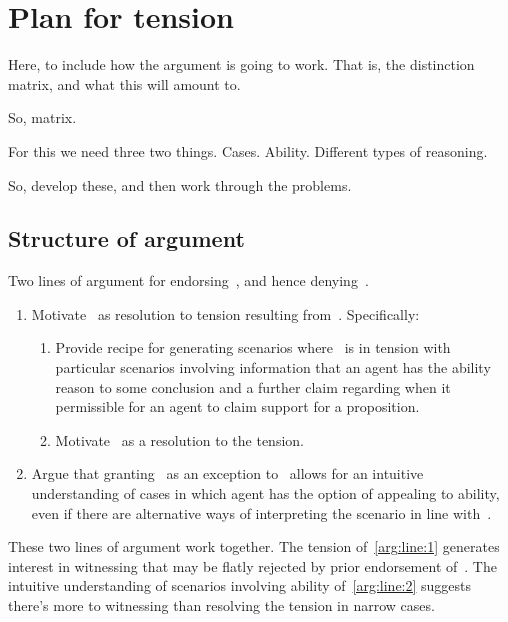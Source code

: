 \chapter{Plan for tension}

\begin{note}
  Here, to include how the argument is going to work.
  That is, the distinction matrix, and what this will amount to.

  So, matrix.

  For this we need three two things.
  Cases.
  Ability.
  Different types of reasoning.

  So, develop these, and then work through the problems.
\end{note}

\section{Structure of argument}
\label{sec:structure-argument}

\begin{note}
  Two lines of argument for endorsing~\EAS{}, and hence denying~\ESU{}.
  \begin{enumerate}[label=(L\arabic*), ref=(L\arabic*)]
  \item\label{arg:line:1} Motivate~\EAS{} as resolution to tension resulting from~\ESU{}.\newline
    Specifically:
    \begin{enumerate}[label=(L1\alph*)]
    \item\label{arg:line:1:a} Provide recipe for generating scenarios where~\ESU{} is in tension with particular scenarios involving information that an agent has the ability reason to some conclusion and a further claim regarding when it permissible for an agent to claim support for a proposition.
    \item\label{arg:line:1:b} Motivate~\EAS{} as a resolution to the tension.
    \end{enumerate}
  \item\label{arg:line:2} Argue that granting~\EAS{} as an exception to~\ESU{} allows for an intuitive understanding of cases in which agent has the option of appealing to ability, even if there are alternative ways of interpreting the scenario in line with~\ESU{}.
  \end{enumerate}
  These two lines of argument work together.
  The tension of~\ref{arg:line:1} generates interest in witnessing that may be flatly rejected by prior endorsement of~\ESU{}.
  The intuitive understanding of scenarios involving ability of~\ref{arg:line:2} suggests there's more to witnessing than resolving the tension in narrow cases.
\end{note}

